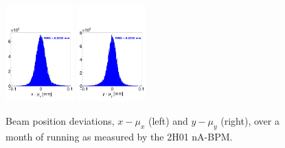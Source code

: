 \begin{figure}[ht]
\begin{center}
\includegraphics[width=0.234\textwidth]{position_2h01x.pdf}
\includegraphics[width=0.234\textwidth]{position_2h01y.pdf}
\caption{Beam position deviations, $x-\mu_x$ (left)  and $y-\mu_y$ (right), over a month of running as measured by the 2H01 nA-BPM. }
\label{fig:position}
\end{center}
\end{figure}







  




